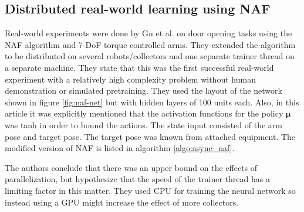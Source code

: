 \subsection{Distributed real-world learning using NAF}

Real-world experiments were done by Gu et al. \cite{gu2016deep} on door opening
tasks using the NAF algorithm and 7-DoF torque controlled arms. They extended
the algorithm to be distributed on several robots/collectors and one separate
trainer thread on a separate machine. They state that this was the first
successful real-world experiment with a relatively high complexity problem
without human demonstration or simulated pretraining. They used the layout of
the network shown in figure \ref{fig:naf-net} but with hidden layers of 100
units each. Also, in this article it was explicitly mentioned that the
activation functions for the policy $\mathbf{\mu}$ was tanh in order to bound
the actions. The state input consisted of the arm pose and target pose. The
target pose was known from attached equipment. The modified version of NAF is
listed in algorithm \ref{algo:async_naf}.

The authors conclude that there was an upper bound on the effects of
parallelization, but hypothesize that the speed of the trainer thread has a
limiting factor in this matter. They used CPU for training the neural network
so instead using a GPU might increase the effect of more collectors.

